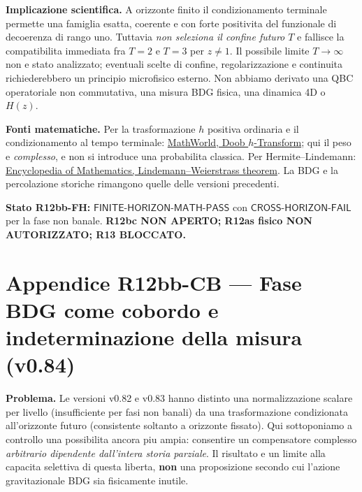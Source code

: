 \documentclass[11pt,a4paper]{article}
\begin{document}
\textbf{Implicazione scientifica.} A orizzonte finito il condizionamento terminale permette una famiglia esatta, coerente e con forte positivita del funzionale di decoerenza di rango uno. Tuttavia \emph{non seleziona il confine futuro $T$} e fallisce la compatibilita immediata fra $T=2$ e $T=3$ per $z\ne1$. Il possibile limite $T\to\infty$ non e stato analizzato; eventuali scelte di confine, regolarizzazione e continuita richiederebbero un principio microfisico esterno. Non abbiamo derivato una QBC operatoriale non commutativa, una misura BDG fisica, una dinamica 4D o $H(z)$.

\textbf{Fonti matematiche.} Per la trasformazione $h$ positiva ordinaria e il condizionamento al tempo terminale: \href{https://mathworld.wolfram.com/Doobh-Transform.html}{MathWorld, Doob $h$-Transform}; qui il peso e \emph{complesso}, e non si introduce una probabilita classica. Per Hermite--Lindemann: \href{https://encyclopediaofmath.org/wiki/Lindemann--Weierstrass_theorem}{Encyclopedia of Mathematics, Lindemann--Weierstrass theorem}. La BDG e la percolazione storiche rimangono quelle delle versioni precedenti.

\textbf{Stato R12bb-FH:} $\textsf{FINITE-HORIZON-MATH-PASS}$ con $\textsf{CROSS-HORIZON-FAIL}$ per la fase non banale. \textbf{R12bc NON APERTO; R12as fisico NON AUTORIZZATO; R13 BLOCCATO.}

\clearpage
\section*{Appendice R12bb-CB --- Fase BDG come cobordo e indeterminazione della misura (v0.84)}
\textbf{Problema.} Le versioni v0.82 e v0.83 hanno distinto una normalizzazione scalare per livello (insufficiente per fasi non banali) da una trasformazione condizionata all'orizzonte futuro (consistente soltanto a orizzonte fissato). Qui sottoponiamo a controllo una possibilita ancora piu ampia: consentire un compensatore complesso \emph{arbitrario dipendente dall'intera storia parziale}. Il risultato e un limite alla capacita selettiva di questa liberta, \textbf{non} una proposizione secondo cui l'azione gravitazionale BDG sia fisicamente inutile.
\end{document}
